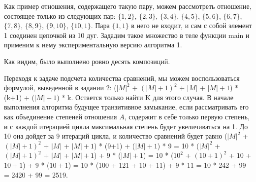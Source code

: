 \documentclass[12pt]{article}
\begin{document}
	Как пример отношения, содержащего такую пару, можем рассмотреть отношение, состоящее только из следующих пар: $\{1, 2\}$, $\{2, 3\}$, $\{3, 4\}$, $\{4, 5\}$, $\{5, 6\}$, $\{6, 7\}$, $\{7, 8\}$, $\{8, 9\}$, $\{9, 10\}$, $\{10, 1\}$. Пара $\{1, 1\}$ в него не входит, и сам с собой элемент 1 соединен цепочкой из 10 дуг. Зададим такое множество в теле функции main и применим к нему экспериментальную версию алгоритма 1.
	
	 
	
	\newpage
	
	\begin{figure}[h]
		\noindent{}
	\end{figure}
	
	Как видим, было выполнено ровно десять композиций. 
	
	Переходя к задаче подсчета количества сравнений, мы можем воспользоваться формулой, выведенной в задании 2: ($|M|^2$ + $(|M|+1)^2$ + $|M|$ + $|M|+1$) * (k+1) + ($|M|+1$) * k. Остается только найти K для этого случая. В начале выполнения алгоритма будущее транзитивное замыкание, если рассматривать его как объединение степеней отношения $A$, содержит в себе только первую степень, и с каждой итерацией цикла максимальная степень будет увеличиваться на 1. До 10 она дойдет за 9 итераций цикла, и количество сравнений будет равно ($|M|^2$ + $(|M|+1)^2$ + $|M|$ + $|M|+1$) * (9+1) + ($|M|+1$) * 9 = 10 * ($|M|^2$ + $(|M|+1)^2$ + $|M|$ + $|M|+1$) + 9 * ($|M|+1$) = 10 * ($10^2$ + $(10+1)^2$ + $10$ + $10+1$) + 9 * ($10+1$) = 10 * (100 + 121 + 10 + 11) + 9 * 11 = 10 * 242 + 99 = 2420 + 99 = 2519.
	
\end{document}
